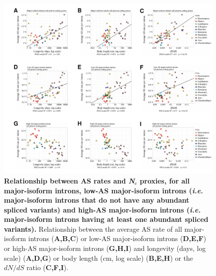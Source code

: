 \begin{figure}[t]   
    \begin{center}                                                                       
        \includegraphics[width=\textwidth] {Figure8_supp.pdf}
    \end{center}                                                                       
    \caption[Relationship between AS rates and \textit{N}$_{\text{e}}$ proxies, for all major-isoform introns, low-AS major-isoform introns (\textit{i.e.} major-isoform introns that do not have any abundant spliced variants) and high-AS major-isoform introns (\textit{i.e.} major-isoform introns having at least one abundant spliced variants).]{\textbf{Relationship between AS rates and \textit{N}$_{\text{e}}$ proxies, for all major-isoform introns, low-AS major-isoform introns (\textit{i.e.} major-isoform introns that do not have any abundant spliced variants) and high-AS major-isoform introns (\textit{i.e.} major-isoform introns having at least one abundant spliced variants).} Relationship between the average AS rate of all major-isoform introns (\textbf{A,B,C}) or low-AS major-isoform introns (\textbf{D,E,F}) or high-AS major-isoform introns (\textbf{G,H,I}) and longevity (days, log scale) (\textbf{A,D,G}) or body length (cm, log scale) (\textbf{B,E,H}) or the ${dN}/{dS}$ ratio (\textbf{C,F,I}).} 
    \label{supp_fig:AS8}
\end{figure}

